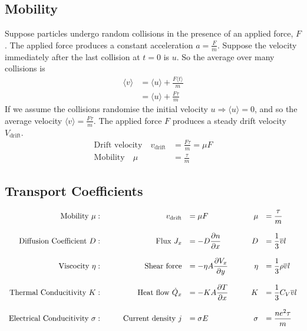 \documentclass[british]{article}
\newcommand{\pd}[2]{\frac{\partial #1}{\partial #2}} %
\begin{document}
\subsection{Mobility}
Suppose particles undergo random collisions in the presence of an applied force, $F$. The applied force produces a constant acceleration $a=\frac{F}{m}$. Suppose the velocity immediately after the last collision at $t=0$ is $u$. So the average over many collisions is 
\begin{align*}
	\langle v \rangle &= \langle u \rangle + \frac{F\langle t \rangle}{m} \\
	&= \langle u \rangle + \frac{F\tau}{m}
\end{align*} 
If we assume the collisions randomise the initial velocity $u \Rightarrow \langle u \rangle =0$, and so the average velocity $\langle v \rangle = \frac{F\tau}{m}$. The applied force $F$ produces a steady drift velocity $V_{\text{drift}}$.
\begin{align*}
	\text{Drift velocity} \quad v_{\text{drift}} &=\frac{F\tau}{m} = \mu F \\
	\text{Mobility} \quad \mu &=\frac{\tau}{m}
\end{align*}

\subsection{Transport Coefficients}

\[
 \begin{array}{r c r l c r l}
  \text{Mobility } \mu :& \quad & v_{\text{drift}} &= \mu F & \quad & \mu &= \displaystyle{\frac{\tau}{m}}\\ \\
  \text{Diffusion Coefficient } D  :&& \text{Flux } J_x &= -D\displaystyle{\pd{n}{x}} && D &=\displaystyle{\frac{1}{3}}\overline{v}l \\ \\
  \text{Viscocity } \eta :&& \text{Shear force} &= -\eta A\displaystyle{\pd{V_x}{y}} && \eta &= \displaystyle{\frac{1}{3}\rho \overline{v}l} \\ \\
  \text{Thermal Conducitivity } K :&& \text{Heat flow } \dot{Q}_x &= \displaystyle{-KA\pd{T}{x}} && K&= \displaystyle{\frac{1}{3}C_V\overline{v}l} \\ \\
  \text{Electrical Conducitivity } \sigma :&& \text{Current density } j &= \sigma E && \sigma &= \displaystyle{\frac{ne^2\tau}{m}} \\ \\
 \end{array}
\]
\end{document}
